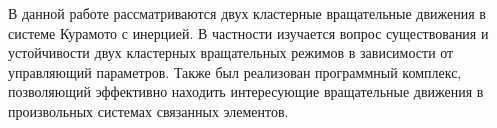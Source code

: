 В данной работе рассматриваются двух кластерные вращательные движения в системе Курамото с инерцией. 
В частности изучается вопрос существования и устойчивости двух кластерных вращательных режимов в зависимости от управляющий параметров.
Также был реализован программный комплекс, позволяющий эффективно находить интересующие вращательные
движения в произвольных системах связанных элементов.
